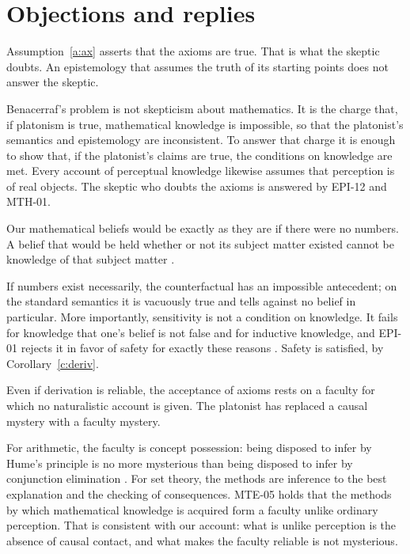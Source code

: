 \documentclass{situationist-preprint}
\begin{document}
\section{Objections and replies}

\begin{objection}\label{o:beg}
Assumption~\ref{a:ax} asserts that the axioms are true. That is what the skeptic doubts. An epistemology that assumes the truth of its starting points does not answer the skeptic.
\end{objection}

\begin{reply}
Benacerraf's problem is not skepticism about mathematics. It is the charge that, if platonism is true, mathematical knowledge is impossible, so that the platonist's semantics and epistemology are inconsistent. To answer that charge it is enough to show that, if the platonist's claims are true, the conditions on knowledge are met. Every account of perceptual knowledge likewise assumes that perception is of real objects. The skeptic who doubts the axioms is answered by EPI-12 and MTH-01.
\end{reply}

\begin{objection}[Insensitivity]
Our mathematical beliefs would be exactly as they are if there were no numbers. A belief that would be held whether or not its subject matter existed cannot be knowledge of that subject matter \citep{Field1989}.
\end{objection}

\begin{reply}
If numbers exist necessarily, the counterfactual has an impossible antecedent; on the standard semantics it is vacuously true and tells against no belief in particular. More importantly, sensitivity is not a condition on knowledge. It fails for knowledge that one's belief is not false and for inductive knowledge, and EPI-01 rejects it in favor of safety for exactly these reasons \citep{Sosa1999}. Safety is satisfied, by Corollary~\ref{c:deriv}.
\end{reply}

\begin{objection}
Even if derivation is reliable, the acceptance of axioms rests on a faculty for which no naturalistic account is given. The platonist has replaced a causal mystery with a faculty mystery.
\end{objection}

\begin{reply}
For arithmetic, the faculty is concept possession: being disposed to infer by Hume's principle is no more mysterious than being disposed to infer by conjunction elimination \citep{HaleWright2002}. For set theory, the methods are inference to the best explanation and the checking of consequences. MTE-05 holds that the methods by which mathematical knowledge is acquired form a faculty unlike ordinary perception. That is consistent with our account: what is unlike perception is the absence of causal contact, and what makes the faculty reliable is not mysterious.
\end{reply}
\end{document}
